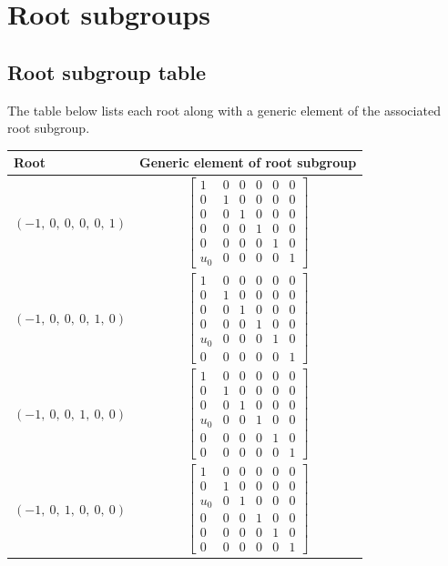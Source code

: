 \documentclass[11pt]{article}
\newcommand{\noi}{\noindent}
\theoremstyle{definition}
\begin{document}
\newpage
\section{Root subgroups}

\subsection{Root subgroup table}

\noi The table below lists each root along with a generic element of the associated root subgroup.

\bigskip

\noindent \begin{longtable}{|l|c|}
    \hline
    \textbf{Root} & \textbf{Generic element of root subgroup} \\
    \hline
    \endhead
    $\left( -1, \  0, \  0, \  0, \  0, \  1\right)$ & ${\left[\begin{matrix}1 & 0 & 0 & 0 & 0 & 0\\0 & 1 & 0 & 0 & 0 & 0\\0 & 0 & 1 & 0 & 0 & 0\\0 & 0 & 0 & 1 & 0 & 0\\0 & 0 & 0 & 0 & 1 & 0\\u_{0} & 0 & 0 & 0 & 0 & 1\end{matrix}\right]}$ \\
    \hline
    $\left( -1, \  0, \  0, \  0, \  1, \  0\right)$ & ${\left[\begin{matrix}1 & 0 & 0 & 0 & 0 & 0\\0 & 1 & 0 & 0 & 0 & 0\\0 & 0 & 1 & 0 & 0 & 0\\0 & 0 & 0 & 1 & 0 & 0\\u_{0} & 0 & 0 & 0 & 1 & 0\\0 & 0 & 0 & 0 & 0 & 1\end{matrix}\right]}$ \\
    \hline
    $\left( -1, \  0, \  0, \  1, \  0, \  0\right)$ & ${\left[\begin{matrix}1 & 0 & 0 & 0 & 0 & 0\\0 & 1 & 0 & 0 & 0 & 0\\0 & 0 & 1 & 0 & 0 & 0\\u_{0} & 0 & 0 & 1 & 0 & 0\\0 & 0 & 0 & 0 & 1 & 0\\0 & 0 & 0 & 0 & 0 & 1\end{matrix}\right]}$ \\
    \hline
    $\left( -1, \  0, \  1, \  0, \  0, \  0\right)$ & ${\left[\begin{matrix}1 & 0 & 0 & 0 & 0 & 0\\0 & 1 & 0 & 0 & 0 & 0\\u_{0} & 0 & 1 & 0 & 0 & 0\\0 & 0 & 0 & 1 & 0 & 0\\0 & 0 & 0 & 0 & 1 & 0\\0 & 0 & 0 & 0 & 0 & 1\end{matrix}\right]}$ \\

\end{longtable}
\end{document}
